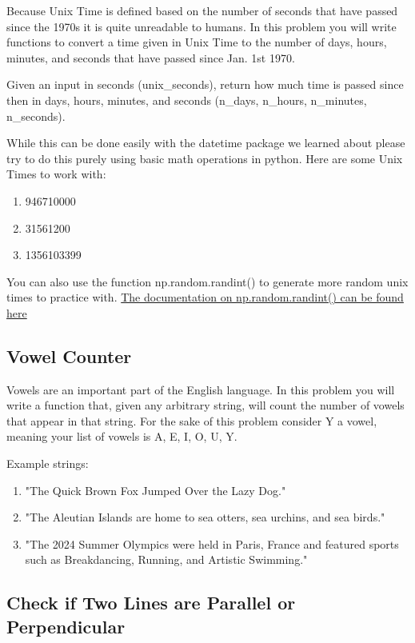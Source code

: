 \documentclass[12pt]{article}
\begin{document}
Because Unix Time is defined based on the number of seconds that have passed since the 1970s it is quite unreadable to humans. In this problem you will write functions to convert a time given in Unix Time to the number of days, hours, minutes, and seconds that have passed since Jan. 1st 1970.

Given an input in seconds (unix\_seconds), return how much time is passed since then in days, hours, minutes, and seconds (n\_days, n\_hours, n\_minutes, n\_seconds).

While this can be done easily with the datetime package we learned about please try to do this purely using basic math operations in python. Here are some Unix Times to work with:
\begin{enumerate}
    \item 946710000
    \item 31561200
    \item 1356103399
\end{enumerate}

You can also use the function np.random.randint() to generate more random unix times to practice with. \href{https://numpy.org/doc/stable/reference/random/generated/numpy.random.randint.html}{The documentation on np.random.randint() can be found here}

\subsection{Vowel Counter}

Vowels are an important part of the English language. In this problem you will write a function that, given any arbitrary string, will count the number of vowels that appear in that string. For the sake of this problem consider Y a vowel, meaning your list of vowels is A, E, I, O, U, Y.

Example strings:
\begin{enumerate}
    \item "The Quick Brown Fox Jumped Over the Lazy Dog."
    \item "The Aleutian Islands are home to sea otters, sea urchins, and sea birds."
    \item "The 2024 Summer Olympics were held in Paris, France and featured sports such as Breakdancing, Running, and Artistic Swimming."
\end{enumerate}

\subsection{Check if Two Lines are Parallel or Perpendicular}
\end{document}
